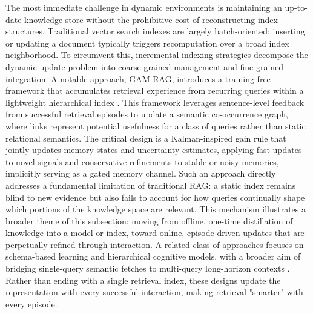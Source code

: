 \documentclass[11pt,a4paper]{article}
\begin{document}
The most immediate challenge in dynamic environments is maintaining an up-to-date knowledge store without the prohibitive cost of reconstructing index structures. Traditional vector search indexes are largely batch-oriented; inserting or updating a document typically triggers recomputation over a broad index neighborhood. To circumvent this, incremental indexing strategies decompose the dynamic update problem into coarse-grained management and fine-grained integration. A notable approach, GAM-RAG, introduces a training-free framework that accumulates retrieval experience from recurring queries within a lightweight hierarchical index \cite{arxiv:2603.01783v1}. This framework leverages sentence-level feedback from successful retrieval episodes to update a semantic co-occurrence graph, where links represent potential usefulness for a class of queries rather than static relational semantics. The critical design is a Kalman-inspired gain rule that jointly updates memory states and uncertainty estimates, applying fast updates to novel signals and conservative refinements to stable or noisy memories, implicitly serving as a gated memory channel. Such an approach directly addresses a fundamental limitation of traditional RAG: a static index remains blind to new evidence but also fails to account for how queries continually shape which portions of the knowledge space are relevant. This mechanism illustrates a broader theme of this subsection: moving from offline, one-time distillation of knowledge into a model or index, toward online, episode-driven updates that are perpetually refined through interaction. A related class of approaches focuses on schema-based learning and hierarchical cognitive models, with a broader aim of bridging single-query semantic fetches to multi-query long-horizon contexts \cite{arxiv:2506.10408v1}. Rather than ending with a single retrieval index, these designs update the representation with every successful interaction, making retrieval "smarter" with every episode.
\end{document}
